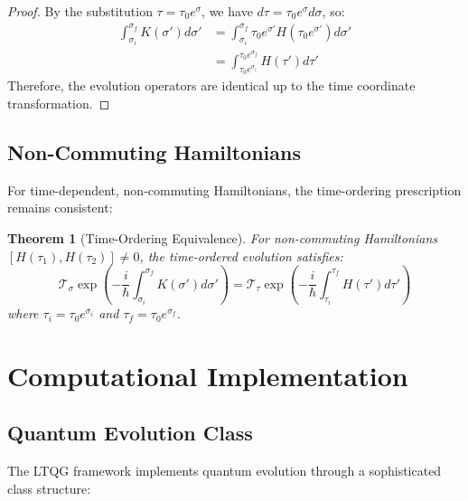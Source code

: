 \documentclass[11pt,a4paper]{article}
\newtheorem{theorem}{Theorem}[section]
\begin{document}
\begin{proof}
By the substitution $\tau = \tau_0 e^{\sigma}$, we have $d\tau = \tau_0 e^{\sigma} d\sigma$, so:
\begin{align}
\int_{\sigma_i}^{\sigma_f} K(\sigma') d\sigma' &= \int_{\sigma_i}^{\sigma_f} \tau_0 e^{\sigma'} H(\tau_0 e^{\sigma'}) d\sigma' \\
&= \int_{\tau_0 e^{\sigma_i}}^{\tau_0 e^{\sigma_f}} H(\tau') d\tau'
\end{align}
Therefore, the evolution operators are identical up to the time coordinate transformation.
\end{proof}

\subsection{Non-Commuting Hamiltonians}

For time-dependent, non-commuting Hamiltonians, the time-ordering prescription remains consistent:

\begin{theorem}[Time-Ordering Equivalence]
For non-commuting Hamiltonians $[H(\tau_1), H(\tau_2)] \neq 0$, the time-ordered evolution satisfies:
\begin{equation}
\mathcal{T}_{\sigma} \exp\left(-\frac{i}{\hbar} \int_{\sigma_i}^{\sigma_f} K(\sigma') d\sigma'\right) = \mathcal{T}_{\tau} \exp\left(-\frac{i}{\hbar} \int_{\tau_i}^{\tau_f} H(\tau') d\tau'\right)
\end{equation}
where $\tau_i = \tau_0 e^{\sigma_i}$ and $\tau_f = \tau_0 e^{\sigma_f}$.
\end{theorem}

\section{Computational Implementation}

\subsection{Quantum Evolution Class}

The LTQG framework implements quantum evolution through a sophisticated class structure:
\end{document}
